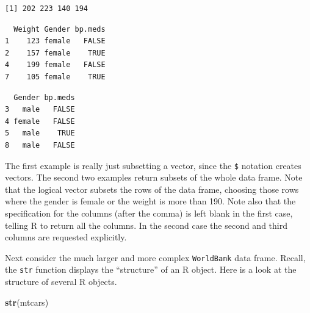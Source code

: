 \documentclass[
]{krantz}
\makeatletter
\newenvironment{Shaded}{\begin{snugshade}}{\end{snugshade}}
\newcommand{\DecValTok}[1]{\textcolor[rgb]{0.06,0.06,0.06}{#1}}
\newcommand{\KeywordTok}[1]{\textcolor[rgb]{0.27,0.27,0.27}{\textbf{#1}}}
\newcommand{\NormalTok}[1]{#1}
\newcommand{\OperatorTok}[1]{\textcolor[rgb]{0.43,0.43,0.43}{\textbf{#1}}}
\newcommand{\StringTok}[1]{\textcolor[rgb]{0.5,0.5,0.5}{#1}}
\newenvironment{kframe}{%
\medskip{}
\setlength{\fboxsep}{.8em}
 \def\at@end@of@kframe{}%
 \ifinner\ifhmode%
  \def\at@end@of@kframe{\end{minipage}}%
  \begin{minipage}{\columnwidth}%
 \fi\fi%
 \def\FrameCommand##1{\hskip\@totalleftmargin \hskip-\fboxsep
 \colorbox{shadecolor}{##1}\hskip-\fboxsep
     \hskip-\linewidth \hskip-\@totalleftmargin \hskip\columnwidth}%
 \MakeFramed {\advance\hsize-\width
   \@totalleftmargin\z@ \linewidth\hsize
   \@setminipage}}%
 {\par\unskip\endMakeFramed%
 \at@end@of@kframe}
\renewenvironment{Shaded}{\begin{kframe}}{\end{kframe}}
\makeatother
\begin{document}
\begin{verbatim}
[1] 202 223 140 194
\end{verbatim}

\begin{Shaded}
\end{Shaded}

\begin{verbatim}
  Weight Gender bp.meds
1    123 female   FALSE
2    157 female    TRUE
4    199 female   FALSE
7    105 female    TRUE
\end{verbatim}

\begin{Shaded}
\end{Shaded}

\begin{verbatim}
  Gender bp.meds
3   male   FALSE
4 female   FALSE
5   male    TRUE
8   male   FALSE
\end{verbatim}

The first example is really just subsetting a vector, since the \texttt{\$} notation creates vectors. The second two examples return subsets of the whole data frame. Note that the logical vector subsets the rows of the data frame, choosing those rows where the gender is female or the weight is more than 190. Note also that the specification for the columns (after the comma) is left blank in the first case, telling R to return all the columns. In the second case the second and third columns are requested explicitly.

Next consider the much larger and more complex \texttt{WorldBank} data frame. Recall, the \texttt{str} function displays the ``structure'' of an R object. Here is a look at the structure of several R objects.

\begin{Shaded}
\begin{Highlighting}[]
\KeywordTok{str}\NormalTok{(mtcars)}
\end{Highlighting}
\end{Shaded}
\end{document}
